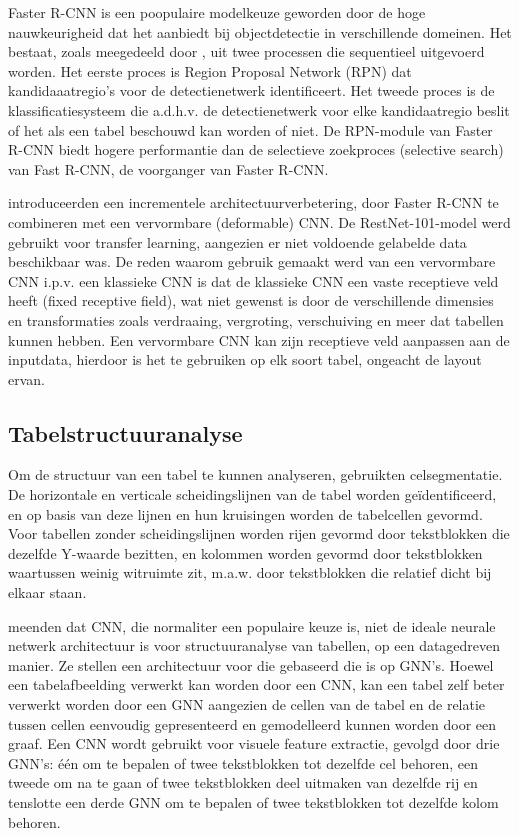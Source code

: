 Faster R-CNN is een poopulaire modelkeuze geworden door de hoge nauwkeurigheid dat het aanbiedt bij objectdetectie in verschillende domeinen. Het bestaat, zoals meegedeeld door \textcite{Shahzad2019}, uit twee processen die sequentieel uitgevoerd worden. Het eerste proces is Region Proposal Network (RPN) dat kandidaaatregio's voor de detectienetwerk identificeert. Het tweede proces is de klassificatiesysteem die a.d.h.v. de detectienetwerk voor elke kandidaatregio beslit of het als een tabel beschouwd kan worden of niet. De RPN-module van Faster R-CNN biedt hogere performantie dan de selectieve zoekproces (selective search) van Fast R-CNN, de voorganger van Faster R-CNN.

\textcite{Siddiqui2018} introduceerden een incrementele architectuurverbetering, door Faster R-CNN te combineren met een vervormbare (deformable) \Gls{CNN}. De RestNet-101-model werd gebruikt voor transfer learning, aangezien er niet voldoende gelabelde data beschikbaar was. De reden waarom gebruik gemaakt werd van een vervormbare \Gls{CNN} i.p.v. een klassieke \Gls{CNN} is dat de klassieke \Gls{CNN} een vaste receptieve veld heeft (fixed receptive field), wat niet gewenst is door de verschillende dimensies en transformaties zoals verdraaing, vergroting, verschuiving en meer dat tabellen kunnen hebben. Een vervormbare \Gls{CNN} kan zijn receptieve veld aanpassen aan de inputdata, hierdoor is het te gebruiken op elk soort tabel, ongeacht de layout ervan.

\subsection{Tabelstructuuranalyse}
\label{subsec:tabel-structuur-analyse}

Om de structuur van een tabel te kunnen analyseren, gebruikten \textcite{Nazemi2016} celsegmentatie. De horizontale en verticale scheidingslijnen van de tabel worden geïdentificeerd, en op basis van deze lijnen en hun kruisingen worden de tabelcellen gevormd. Voor tabellen zonder scheidingslijnen worden rijen gevormd door tekstblokken die dezelfde Y-waarde bezitten, en kolommen worden gevormd door tekstblokken waartussen weinig witruimte zit, m.a.w. door tekstblokken die relatief dicht bij elkaar staan.

\textcite{Qasim2019} meenden dat \Gls{CNN}, die normaliter een populaire keuze is, niet de ideale neurale netwerk architectuur is voor structuuranalyse van tabellen, op een datagedreven manier. Ze stellen een architectuur voor die gebaseerd die is op \Gls{GNN}'s. Hoewel een tabelafbeelding verwerkt kan worden door een \Gls{CNN}, kan een tabel zelf beter verwerkt worden door een \Gls{GNN} aangezien de cellen van de tabel en de relatie tussen cellen eenvoudig gepresenteerd en gemodelleerd kunnen worden door een graaf. Een \Gls{CNN} wordt gebruikt voor visuele feature extractie, gevolgd door drie \Gls{GNN}'s: één om te bepalen of twee tekstblokken tot dezelfde cel behoren, een tweede om na te gaan of twee tekstblokken deel uitmaken van dezelfde rij en tenslotte een derde \Gls{GNN} om te bepalen of twee tekstblokken tot dezelfde kolom behoren.

